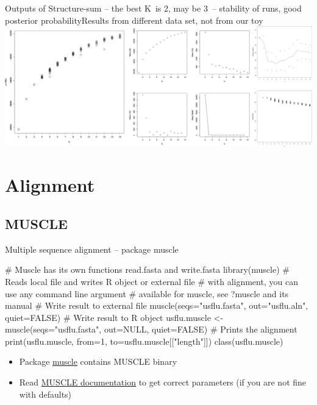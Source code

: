 \documentclass[compress, ucs, xelatex, 11pt, xcolor=svgnames,
  hyperref={
    bookmarks=true,
    unicode=true,
    colorlinks=true,
    pdftitle={Molecular data in R},
    plainpages=false,
    pdfauthor={Vojtech Zeisek},
    pdfsubject={Course about phylogeny and evolution in R},
    pdfcreator={XeLaTeX},
    pdfkeywords={R, evolution, phylogeny, molecular data},
    linkcolor=Tomato,
    anchorcolor=SaddleBrown,
    citecolor=Goldenrod,
    filecolor=DarkMagenta,
    menucolor=Sienna,
    urlcolor=DarkTurquoise,
    pdftex},
  url={hyphens, lowtilde} %
  ]{beamer}
\begin{document}
\begin{frame}{Outputs of Structure-sum -- the best K~is 2, may be 3~-- stability of runs, good posterior probability}{Results from different data set, not from our toy}
  \includegraphics[width=\textwidth]{structure.png}
\end{frame}

\section{Alignment}

\subsection{MUSCLE}

\begin{frame}[fragile]{Multiple sequence alignment -- package muscle}
  \begin{spluscode}
    # Muscle has its own functions read.fasta and write.fasta
    library(muscle)
    # Reads local file and writes R object or external file
    # with alignment, you can use any command line argument
    # available for muscle, see ?muscle and its manual
    # Write result to external file
    muscle(seqs="usflu.fasta", out="usflu.aln", quiet=FALSE)
    # Write result to R object
    usflu.muscle <- muscle(seqs="usflu.fasta", out=NULL, quiet=FALSE)
    # Prints the alignment
    print(usflu.muscle, from=1, to=usflu.muscle[["length"]])
    class(usflu.muscle)
  \end{spluscode}
\begin{itemize}
 \item Package \href{https://www.bioconductor.org/packages/release/bioc/html/muscle.html}{muscle} contains MUSCLE binary
 \item Read \href{http://www.drive5.com/muscle/manual/}{MUSCLE documentation} to get correct parameters (if you are not fine with defaults)
\end{itemize}
\end{frame}
\end{document}
